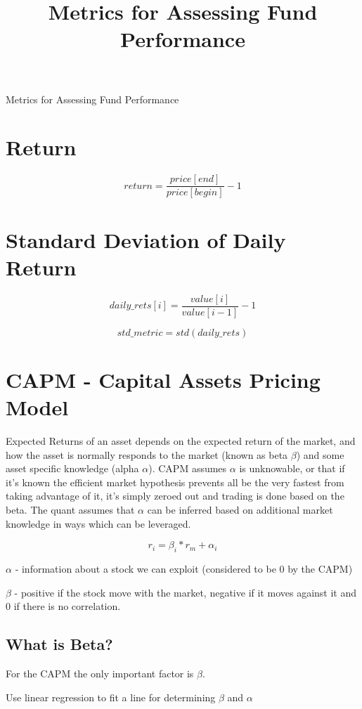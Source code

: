 \documentclass{article}
\title{Metrics for Assessing Fund Performance}
\author{Michael Schwab \thanks }
\begin{document}
    \centerline{\Large Metrics for Assessing Fund Performance}
    \section{Return}
    \begin{equation}
    return = \frac{price[end] }{price[begin]}- 1
    \end{equation}
    \section{Standard Deviation of Daily Return}
    
    \begin{equation}
        daily\_rets[i] = \frac{value[i]}{value[i-1]} -1 
    \end{equation} 
    
    \begin{equation}
        std\_metric = std(daily\_rets)
    \end{equation}
    \section{CAPM - Capital Assets Pricing Model }
     Expected Returns of an asset depends on the expected return of the market, 
    and how the asset is normally responds to the market (known as beta $\beta$) and some asset specific knowledge (alpha $\alpha$).  
    CAPM assumes $\alpha$ is unknowable, or that if it's known the efficient market hypothesis prevents all be the very fastest from taking advantage of it, it's simply zeroed out and trading is done based on the beta.  
    The quant assumes that $\alpha$ can be inferred based on additional market knowledge in ways which can be leveraged.

    $$r_i=\beta_i*r_m+\alpha_i$$

    $\alpha$ - information about a stock we can exploit (considered to be 0 by the CAPM)

    $\beta$ - positive if the stock move with the market, negative if it moves against it and 0 if there is no correlation.
    \subsection{What is Beta?}
    For the CAPM the only important factor is $\beta$. 
    
    Use linear regression to fit a line for determining $\beta$ and $\alpha$


\end{document}
